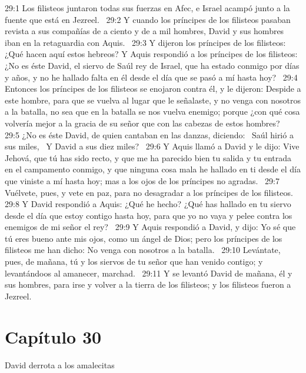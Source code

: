 29:1 Los filisteos juntaron todas sus fuerzas en Afec, e Israel acampó junto a la fuente que está en Jezreel.  
29:2 Y cuando los príncipes de los filisteos pasaban revista a sus compañías de a ciento y de a mil hombres, David y sus hombres iban en la retaguardia con Aquis.  
29:3 Y dijeron los príncipes de los filisteos: ¿Qué hacen aquí estos hebreos? Y Aquis respondió a los príncipes de los filisteos: ¿No es éste David, el siervo de Saúl rey de Israel, que ha estado conmigo por días y años, y no he hallado falta en él desde el día que se pasó a mí hasta hoy?  
29:4 Entonces los príncipes de los filisteos se enojaron contra él, y le dijeron: Despide a este hombre, para que se vuelva al lugar que le señalaste, y no venga con nosotros a la batalla, no sea que en la batalla se nos vuelva enemigo; porque ¿con qué cosa volvería mejor a la gracia de su señor que con las cabezas de estos hombres?  
29:5 ¿No es éste David, de quien cantaban en las danzas, diciendo:  
Saúl hirió a sus miles,  
Y David a sus diez miles?  
29:6 Y Aquis llamó a David y le dijo: Vive Jehová, que tú has sido recto, y que me ha parecido bien tu salida y tu entrada en el campamento conmigo, y que ninguna cosa mala he hallado en ti desde el día que viniste a mí hasta hoy; mas a los ojos de los príncipes no agradas.  
29:7 Vuélvete, pues, y vete en paz, para no desagradar a los príncipes de los filisteos.  
29:8 Y David respondió a Aquis: ¿Qué he hecho? ¿Qué has hallado en tu siervo desde el día que estoy contigo hasta hoy, para que yo no vaya y pelee contra los enemigos de mi señor el rey?  
29:9 Y Aquis respondió a David, y dijo: Yo sé que tú eres bueno ante mis ojos, como un ángel de Dios; pero los príncipes de los filisteos me han dicho: No venga con nosotros a la batalla.  
29:10 Levántate, pues, de mañana, tú y los siervos de tu señor que han venido contigo; y levantándoos al amanecer, marchad.  
29:11 Y se levantó David de mañana, él y sus hombres, para irse y volver a la tierra de los filisteos; y los filisteos fueron a Jezreel.  
\section*{Capítulo 30}
David derrota a los amalecitas  

